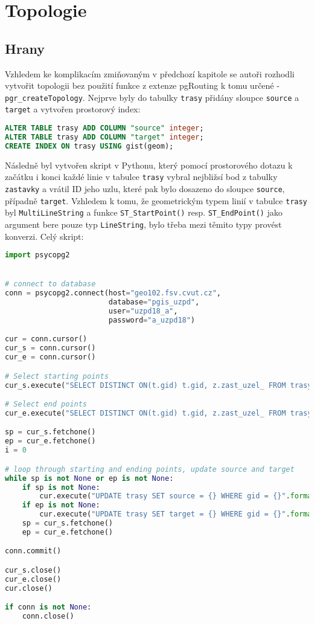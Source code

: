 \documentclass[a4paper, 12pt]{article}
\begin{document}
\section{Topologie}
\subsection{Hrany}
Vzhledem ke komplikacím zmiňovaným v předchozí kapitole se autoři rozhodli vytvořit topologii bez použití funkce z extenze pgRouting k tomu určené -  \texttt{pgr\_createTopology}. Nejprve byly do tabulky \texttt{trasy} přidány sloupce \texttt{source} a \texttt{target} a vytvořen prostorový index: 
\begin{lstlisting}[language=sql]
ALTER TABLE trasy ADD COLUMN "source" integer;
ALTER TABLE trasy ADD COLUMN "target" integer;
CREATE INDEX ON trasy USING gist(geom);
\end{lstlisting} 

Následně byl vytvořen skript v Pythonu, který pomocí prostorového dotazu k začátku i konci každé linie v tabulce \texttt{trasy} vybral nejbližsí bod z tabulky \texttt{zastavky} a vrátil ID jeho uzlu, které pak bylo dosazeno do sloupce \texttt{source}, případně \texttt{target}. Vzhledem k tomu, že geometrickým typem linií v tabulce \texttt{trasy} byl \texttt{MultiLineString} a funkce \texttt{ST\_StartPoint()} resp. \texttt{ST\_EndPoint()} jako argument bere pouze typ \texttt{LineString}, bylo třeba mezi těmito typy provést konverzi.
\newpage
Celý skript:
\begin{lstlisting}[language=python]
import psycopg2


# connect to database
conn = psycopg2.connect(host="geo102.fsv.cvut.cz",
						database="pgis_uzpd",
						user="uzpd18_a",
						password="a_uzpd18")

cur = conn.cursor()
cur_s = conn.cursor()
cur_e = conn.cursor()

# Select starting points
cur_s.execute("SELECT DISTINCT ON(t.gid) t.gid, z.zast_uzel_ FROM trasy t, zastavky z WHERE ST_DWithin(ST_StartPoint(ST_LineMerge(t.geom)), z.geom, 500) AND t.zast_id_od = z.zast_id")

# Select end points
cur_e.execute("SELECT DISTINCT ON(t.gid) t.gid, z.zast_uzel_ FROM trasy t, zastavky z WHERE ST_DWithin(ST_EndPoint(ST_LineMerge(t.geom)), z.geom, 500) AND t.zast_id_ka = z.zast_id")

sp = cur_s.fetchone()
ep = cur_e.fetchone()
i = 0

# loop through starting and ending points, update source and target
while sp is not None or ep is not None:
	if sp is not None:
		cur.execute("UPDATE trasy SET source = {} WHERE gid = {}".format(sp[1],sp[0]))
	if ep is not None:
		cur.execute("UPDATE trasy SET target = {} WHERE gid = {}".format(ep[1],ep[0]))
	sp = cur_s.fetchone()
	ep = cur_e.fetchone()		

conn.commit()

cur_s.close()
cur_e.close()
cur.close()

if conn is not None:
	conn.close()
\end{lstlisting}
\end{document}
